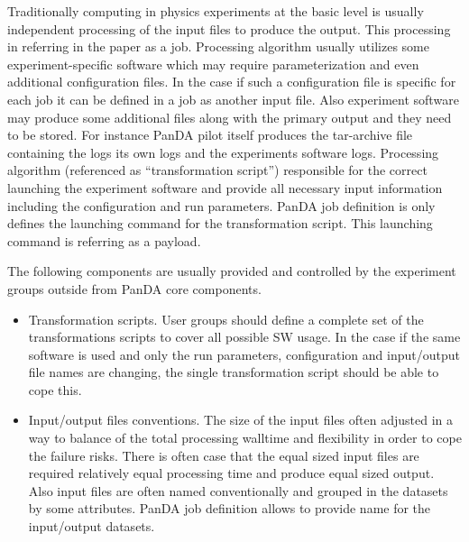 
%
%

Traditionally computing in physics experiments at the basic level is usually
independent processing of the input files to produce the output. This
processing in referring in the paper as a job. Processing algorithm usually
utilizes some experiment-specific software which may require parameterization
and even additional configuration files. In the case if such a configuration
file is specific for each job it can be defined in a job as another input file.
Also experiment software may produce some additional files along with the
primary output and they need to be stored. For instance PanDA pilot itself
produces the tar-archive file containing the logs its own logs and the
experiments software logs. Processing algorithm (referenced as ``transformation
script'') responsible for the correct launching the experiment software and
provide all necessary input information including the configuration and run
parameters. PanDA job definition is only defines the launching command for the
transformation script. This launching command is referring as a payload.

The following components are usually provided and controlled by the experiment groups outside from PanDA core components.
\begin{itemize}
    \item Transformation scripts. User groups should define a complete set of
        the transformations scripts to cover all possible SW usage. In the case
        if the same software is used and only the run parameters, configuration
        and input/output file names are changing, the single transformation
        script should be able to cope this.
    \item Input/output files conventions. The size of the input files often
        adjusted in a way to balance of the total processing walltime and
        flexibility in order to cope the failure risks. There is often case
        that the equal sized input files are required relatively equal
        processing time and produce equal sized output. Also input files are
        often named conventionally and grouped in the datasets by some
        attributes. PanDA job definition allows to provide name for the
        input/output datasets.
\end{itemize}

